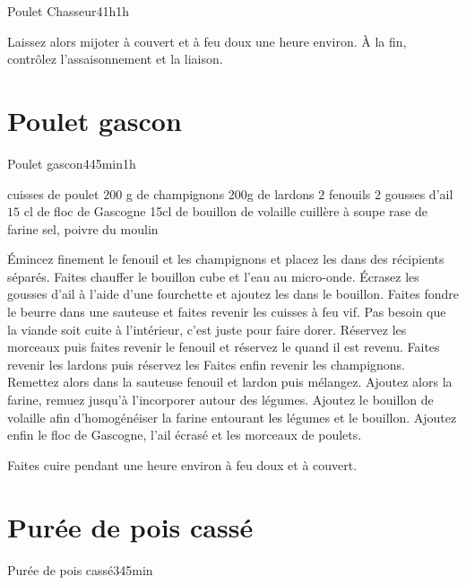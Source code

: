 {\begin{recette}{Poulet Chasseur}{4}{1h}{1h}
\begin{cuisson}
Laissez alors mijoter à couvert et à feu doux une heure environ. À la fin, contrôlez l'assaisonnement et la liaison.
\end{cuisson}
\end{recette}

\section{Poulet gascon}
\begin{recette}{Poulet gascon}{4}{45min}{1h}

\begin{ingredients}
 cuisses de poulet
\ingredient $200$ g de champignons
\ingredient 200g de lardons
\ingredient $2$ fenouils
\ingredient $2$ gousses d'ail
\ingredient $15$ cl de floc de Gascogne
\ingredient 15cl de bouillon de volaille
 cuillère à soupe rase de farine
\ingredient sel, poivre du moulin
\end{ingredients}

\begin{preparation}
\etape Émincez finement le fenouil et les champignons et placez les dans des récipients séparés.
\etape Faites chauffer le bouillon cube et l'eau au micro-onde. Écrasez les gousses d'ail à l'aide d'une fourchette et ajoutez 
les dans le bouillon.
\etape Faites fondre le beurre dans une sauteuse et faites revenir les cuisses à feu vif. Pas besoin que la viande soit cuite à 
l'intérieur, c'est juste pour faire dorer.
\etape Réservez les morceaux puis faites revenir le fenouil et réservez le quand il est revenu.
\etape Faites revenir les lardons puis réservez les
\etape Faites enfin revenir les champignons.
\etape Remettez alors dans la sauteuse fenouil et lardon puis mélangez.
\etape Ajoutez alors la farine, remuez jusqu'à l'incorporer autour des légumes.
\etape Ajoutez le bouillon de volaille afin d'homogénéiser la farine entourant les légumes et le bouillon.
\etape Ajoutez enfin le floc de Gascogne, l'ail écrasé et les morceaux de poulets.
\end{preparation}

\begin{cuisson}
Faites cuire pendant une heure environ à feu doux et à couvert.
\end{cuisson}

\end{recette}

\section{Purée de pois cassé}
\begin{recette}{Purée de pois cassé}{3}{45min}{}


\end{recette}}
